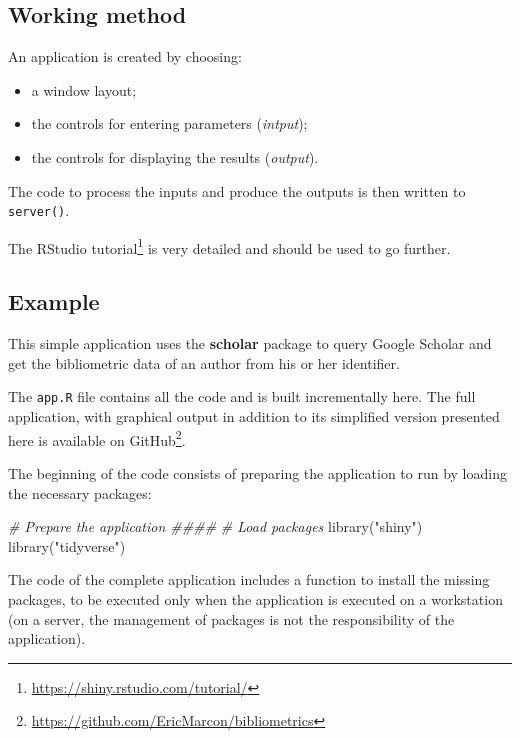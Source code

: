 \documentclass[
  12pt,
  american,
  a4paper,
  extrafontsizes,onecolumn,openright
  ]{memoir}
\newenvironment{Shaded}{\begin{snugshade}}{\end{snugshade}}
\newcommand{\CommentTok}[1]{\textcolor[rgb]{0.56,0.35,0.01}{\textit{#1}}}
\newcommand{\FunctionTok}[1]{\textcolor[rgb]{0.00,0.00,0.00}{#1}}
\newcommand{\NormalTok}[1]{#1}
\newcommand{\StringTok}[1]{\textcolor[rgb]{0.31,0.60,0.02}{#1}}
\providecommand{\tightlist}{%
  \setlength{\itemsep}{0pt}\setlength{\parskip}{0pt}}
\begin{document}
\hypertarget{working-method}{%
\subsection{Working method}\label{working-method}}

An application is created by choosing:

\begin{itemize}
\tightlist
\item
  a window layout;
\item
  the controls for entering parameters (\emph{intput});
\item
  the controls for displaying the results (\emph{output}).
\end{itemize}

The code to process the inputs and produce the outputs is then written to \texttt{server()}.

The RStudio tutorial\footnote{\url{https://shiny.rstudio.com/tutorial/}} is very detailed and should be used to go further.

\hypertarget{example}{%
\subsection{Example}\label{example}}

This simple application uses the \textbf{scholar} package to query Google Scholar and get the bibliometric data of an author from his or her identifier.

The \texttt{app.R} file contains all the code and is built incrementally here.
The full application, with graphical output in addition to its simplified version presented here is available on GitHub\footnote{\url{https://github.com/EricMarcon/bibliometrics}}.

The beginning of the code consists of preparing the application to run by loading the necessary packages:

\scriptsize

\begin{Shaded}
\begin{Highlighting}[]
\CommentTok{\# Prepare the application \#\#\#\#}
\CommentTok{\# Load packages}
\FunctionTok{library}\NormalTok{(}\StringTok{"shiny"}\NormalTok{)}
\FunctionTok{library}\NormalTok{(}\StringTok{"tidyverse"}\NormalTok{)}
\end{Highlighting}
\end{Shaded}

\normalsize

The code of the complete application includes a function to install the missing packages, to be executed only when the application is executed on a workstation (on a server, the management of packages is not the responsibility of the application).
\end{document}
